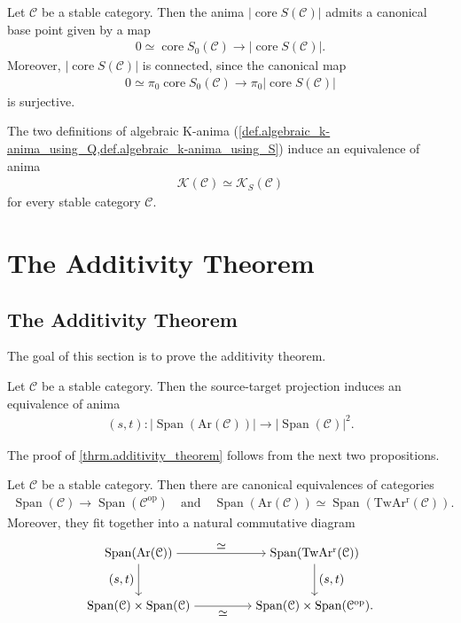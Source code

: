 \documentclass[a4paper,dvipdfmx,11pt,reqno]{amsart}
\DeclareMathOperator{\myop}{op}
\DeclareMathOperator{\core}{core}
\DeclareMathOperator{\Span}{Span}
\newcommand{\C}{\mathcal{C}}
\newcommand{\K}{\mathcal{K}}
\newcommand{\Ar}{\mathrm{Ar}}
\newcommand{\TwArr}{\mathrm{TwAr^{r}}}
\begin{document}
\begin{remark} %
  Let $\C$ be a stable category.
  Then the anima $|\core S(\C)|$ admits a canonical base point given by a map 
  \begin{align*}
    0 \simeq \core S_0(\C) \to |\core S(\C)|.
  \end{align*}
  Moreover, $|\core S(\C)|$ is connected, since the canonical map 
  \begin{align*}
    0 \simeq \pi_0 \core S_0(\C) \to \pi_0 |\core S(\C)|
  \end{align*}
  is surjective.
\end{remark}

\begin{proposition}
  The two definitions of algebraic K-anima (\cref{def.algebraic_k-anima_using_Q,def.algebraic_k-anima_using_S}) induce an equivalence of anima
  \begin{align*}
    \K(\C) \simeq \K_S(\C)
  \end{align*}
  for every stable category $\C$.
\end{proposition}


\section{The Additivity Theorem}

\subsection{The Additivity Theorem}

The goal of this section is to prove the additivity theorem.

\begin{theorem} \label{thrm.additivity_theorem}
  Let $\C$ be a stable category.
  Then the source-target projection induces an equivalence of anima 
  \begin{align*}
    (s,t) : |\Span(\Ar(\C))| \to |\Span(\C)|^2.
  \end{align*}
\end{theorem}

The proof of \cref{thrm.additivity_theorem} follows from the next two propositions.

\begin{proposition}
  Let $\C$ be a stable category.
  Then there are canonical equivalences of categories
  \begin{align*}
    \Span(\C) \to \Span(\C^{\myop}) \quad \text{and} \quad \Span(\Ar(\C)) \simeq \Span(\TwArr(\C)).
  \end{align*}
  Moreover, they fit together into a natural commutative diagram 
  \[\begin{tikzpicture}[auto,->] 
    \node (tl) at (0,1.5) {$\Span(\Ar(\C))$}; 
    \node (tr) at (5,1.5) {$\Span(\TwArr(\C))$};
    \node (bl) at (0,0) {$\Span(\C) \times \Span(\C)$}; 
    \node (br) at (5,0) {$\Span(\C) \times \Span(\C^{\myop}).$}; 
    \draw (tl) -- node {$\simeq$} (tr); 
    \draw (bl) -- node[swap] {$\simeq$} (br); 
    \draw (tl) -- node[swap] {$(s,t)$} (bl);
    \draw (tr) -- node {$(s,t)$} (br); 
  \end{tikzpicture}\]
\end{proposition}
\end{document}
